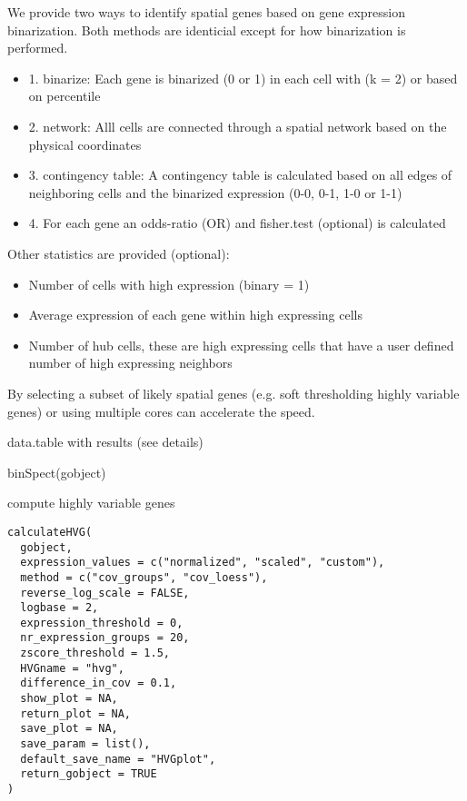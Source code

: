 \documentclass[a4paper]{book}
\begin{document}
\begin{Details}\relax
We provide two ways to identify spatial genes based on gene expression binarization.
Both methods are identicial except for how binarization is performed.
\begin{itemize}

\item{} 1. binarize: Each gene is binarized (0 or 1) in each cell with  (k = 2) or based on  percentile
\item{} 2. network: Alll cells are connected through a spatial network based on the physical coordinates
\item{} 3. contingency table: A contingency table is calculated based on all edges of neighboring cells and the binarized expression (0-0, 0-1, 1-0 or 1-1)
\item{} 4. For each gene an odds-ratio (OR) and fisher.test (optional) is calculated

\end{itemize}

Other statistics are provided (optional):
\begin{itemize}

\item{} Number of cells with high expression (binary = 1)
\item{} Average expression of each gene within high expressing cells 
\item{} Number of hub cells, these are high expressing cells that have a user defined number of high expressing neighbors

\end{itemize}

By selecting a subset of likely spatial genes (e.g. soft thresholding highly variable genes) or using multiple cores can accelerate the speed.
\end{Details}
%
\begin{Value}
data.table with results (see details)
\end{Value}
%
\begin{Examples}
\begin{ExampleCode}
    binSpect(gobject)
\end{ExampleCode}
\end{Examples}
%
\begin{Description}\relax
compute highly variable genes
\end{Description}
%
\begin{Usage}
\begin{verbatim}
calculateHVG(
  gobject,
  expression_values = c("normalized", "scaled", "custom"),
  method = c("cov_groups", "cov_loess"),
  reverse_log_scale = FALSE,
  logbase = 2,
  expression_threshold = 0,
  nr_expression_groups = 20,
  zscore_threshold = 1.5,
  HVGname = "hvg",
  difference_in_cov = 0.1,
  show_plot = NA,
  return_plot = NA,
  save_plot = NA,
  save_param = list(),
  default_save_name = "HVGplot",
  return_gobject = TRUE
)
\end{verbatim}
\end{Usage}
\end{document}
